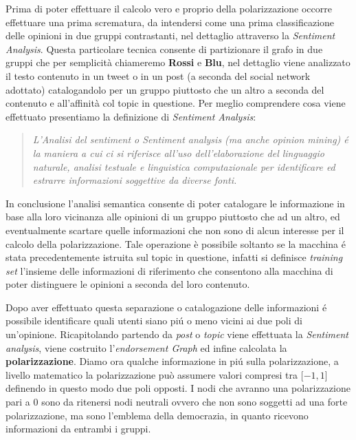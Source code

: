Prima di poter effettuare il calcolo vero e proprio della polarizzazione occorre effettuare una prima scrematura, da intendersi come una prima classificazione delle opinioni in due gruppi contrastanti, nel dettaglio attraverso la \textit{Sentiment Analysis}. Questa particolare tecnica consente di partizionare il grafo in due gruppi che per semplicità chiameremo \textbf{Rossi} e \textbf{Blu}, nel dettaglio viene analizzato il testo contenuto in un tweet o in un post (a seconda del social network adottato) catalogandolo per un gruppo piuttosto che un altro a seconda del contenuto e all'affinità col topic in questione. 
Per meglio comprendere cosa viene effettuato presentiamo la definizione di \textit{Sentiment Analysis}:
\begin{quote}
\textit{L'Analisi del sentiment o Sentiment analysis (ma anche opinion mining) \'e la maniera a cui ci si riferisce all'uso dell'elaborazione del linguaggio naturale, analisi testuale e linguistica computazionale per identificare ed estrarre informazioni soggettive da diverse fonti.} 
\end{quote}

In conclusione l'analisi semantica consente di poter catalogare le informazione in base alla loro vicinanza alle opinioni di un gruppo piuttosto che ad un altro, ed eventualmente scartare quelle informazioni che non sono di alcun interesse per il calcolo della polarizzazione. Tale operazione è possibile soltanto se la macchina \'e stata precedentemente istruita sul topic in questione, infatti si definisce \textit{training set} l'insieme delle informazioni di riferimento che consentono alla macchina di poter distinguere le opinioni a seconda del loro contenuto.

Dopo aver effettuato questa separazione o catalogazione delle informazioni \'e possibile identificare quali utenti siano pi\'u o meno vicini ai due poli di un'opinione. Ricapitolando partendo da \textit{post} o \textit{topic} viene effettuata la \textit{Sentiment analysis}, viene costruito l'\textit{endorsement Graph} ed infine calcolata la \textbf{polarizzazione}.
Diamo ora qualche informazione in pi\'u sulla polarizzazione, a livello matematico la polarizzazione può assumere valori compresi tra $[-1,1$] definendo in questo modo due poli opposti. I nodi che avranno una polarizzazione pari a 0 sono da ritenersi nodi neutrali ovvero che non sono soggetti ad una forte polarizzazione, ma sono l'emblema della democrazia, in quanto ricevono informazioni da entrambi i gruppi.

